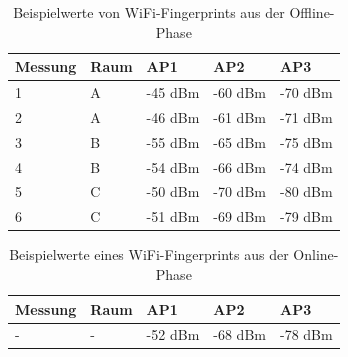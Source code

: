 \begin{table}[h]
    \centering
    \begin{tabularx}{\textwidth}{|X|X|X|X|X|}
        \hline
        Messung & Raum & AP1 & AP2 & AP3 \\ \hline
        1 & A & -45 dBm & -60 dBm & -70 dBm \\ \hline
        2 & A & -46 dBm & -61 dBm & -71 dBm \\ \hline
        3 & B & -55 dBm & -65 dBm & -75 dBm \\ \hline
        4 & B & -54 dBm & -66 dBm & -74 dBm \\ \hline
        5 & C & -50 dBm & -70 dBm & -80 dBm \\ \hline
        6 & C & -51 dBm & -69 dBm & -79 dBm \\ \hline
    \end{tabularx}
    \caption{Beispielwerte von WiFi-Fingerprints aus der Offline-Phase}
    \label{tab:trainingsdaten}
\end{table}

\begin{table}[h]
    \centering
    \begin{tabularx}{\textwidth}{|X|X|X|X|X|}
        \hline
        Messung & Raum & AP1 & AP2 & AP3 \\ \hline
        - & - & -52 dBm & -68 dBm & -78 dBm \\ \hline
    \end{tabularx}
    \caption{Beispielwerte eines WiFi-Fingerprints aus der Online-Phase}
    \label{tab:testdaten}
\end{table}





